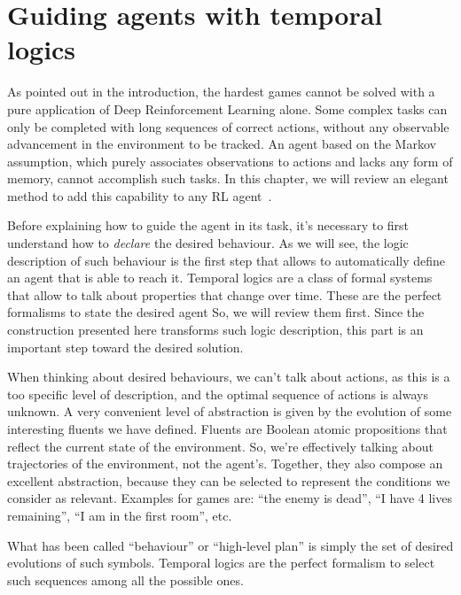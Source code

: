 \chapter{Guiding agents with temporal logics}

As pointed out in the introduction, the hardest games cannot be solved with a
pure application of Deep Reinforcement Learning alone. Some complex tasks can
only be completed with long sequences of correct actions, without any
observable advancement in the environment to be tracked. An agent based on the
Markov assumption, which purely associates observations to actions and lacks
any form of memory, cannot accomplish such tasks.  In this chapter, we will
review an elegant method to add this capability to any RL
agent~\cite{bib:nmrdp-logic-first}\cite{bib:degiacomo-logic-nmrdp}.

Before explaining how to guide the agent in its task, it's necessary to
first understand how to \emph{declare} the desired behaviour. As we will see,
the logic description of such behaviour is the first step that allows to
automatically define an agent that is able to reach it.
Temporal logics
are a class of formal systems that allow to talk about properties that change
over time. These are the perfect formalisms to state the desired agent
So, we will review them first. Since the construction presented
here transforms such logic description, this part is an important step toward
the desired solution.

When thinking about desired behaviours, we can't talk about actions, as
this is a too specific level of description, and the optimal sequence of
actions is always unknown. A very convenient level of abstraction is given by
the evolution of some interesting fluents we have defined. Fluents are Boolean
atomic propositions that reflect the current state of the environment. So,
we're effectively talking about trajectories of the environment, not the
agent's.  Together, they also compose an excellent abstraction, because they
can be selected to represent the conditions we consider as relevant. Examples
for games are: ``the enemy is dead'', ``I have 4 lives remaining'', ``I am in
the first room'', etc.

What has been called ``behaviour'' or ``high-level plan'' is simply the set of
desired evolutions of such symbols. Temporal logics are the perfect formalism
to select such sequences among all the possible ones.


